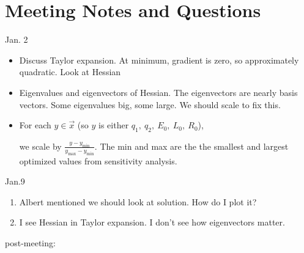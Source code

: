 \documentclass{article}
\begin{document}
\section{Meeting Notes and Questions}

Jan. 2

\begin{itemize}
	\item Discuss Taylor expansion.  At minimum, gradient is zero, so approximately quadratic.  Look at Hessian
	\item Eigenvalues and eigenvectors of Hessian.  The eigenvectors are nearly basis vectors.  Some eigenvalues big, some large.  We should scale to fix this.
	\item For each $y \in \vec{x}$ (so $y$ is either $q_1,~q_2,~E_0,~L_0,~R_0$), 
	
	we scale by $\frac{y- y_{\min}}{y_{\max} - y_{\min}} .$  The min and max are the the smallest and largest optimized values from sensitivity analysis.
\end{itemize}

Jan.9


\begin{enumerate}
	\item Albert mentioned we should look at solution.  How do I plot it?
	\item I see Hessian in Taylor expansion.  I don't see how eigenvectors matter.
\end{enumerate}

post-meeting:
\end{document}
